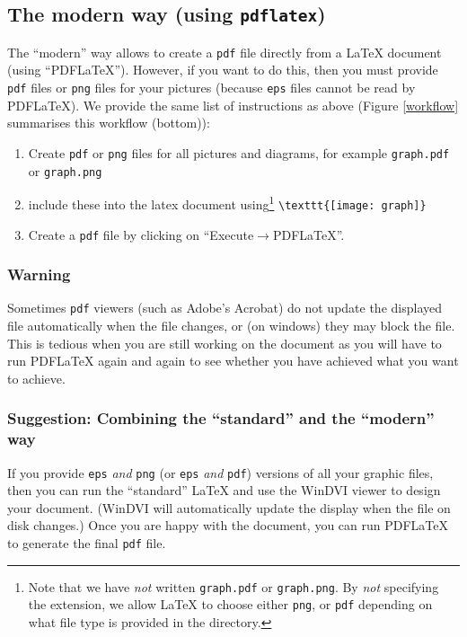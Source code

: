\documentclass[12pt,a4paper]{article}
\begin{document}
\subsection{The modern way  (using \texttt{pdflatex})}

The ``modern'' way allows to create a \texttt{pdf} file directly from
a LaTeX document (using ``PDFLaTeX''). However, if you want to do
this, then you must provide \texttt{pdf} files or \texttt{png} files
for your pictures (because \texttt{eps} files cannot be read by
PDFLaTeX). We provide the same list of instructions as above (Figure
\ref{workflow} summarises this workflow (bottom)):

\begin{enumerate}
\item Create \texttt{pdf} or \texttt{png} files for all pictures and
  diagrams, for example \texttt{graph.pdf} or \texttt{graph.png}
\item include these into the latex document using\footnote{Note that
    we have \emph{not} written \texttt{graph.pdf} or
    \texttt{graph.png}. By \emph{not} specifying the extension, we
    allow LaTeX to choose either \texttt{png}, or \texttt{pdf}
    depending on what file type is provided in the directory.}
  \verb|\texttt{[image: graph]}|
\item Create a \texttt{pdf} file by clicking on
  ``Execute$\rightarrow$PDFLaTeX''.
\end{enumerate}
\bigskip

\subsubsection*{Warning} 

Sometimes \texttt{pdf} viewers (such as Adobe's Acrobat) do not update
the displayed file automatically when the file changes, or (on
windows) they may block the file. This is tedious when you are still
working on the document as you will have to run PDFLaTeX again and
again to see whether you have achieved what you want to achieve.
\bigskip

\subsubsection*{Suggestion: Combining the ``standard'' and the
  ``modern'' way}

If you provide \texttt{eps} \emph{and} \texttt{png} (or \texttt{eps}
\emph{and} \texttt{pdf}) versions of all your graphic files, then you
can run the ``standard'' LaTeX and use the WinDVI viewer to design
your document. (WinDVI will automatically update the display when the
file on disk changes.) Once you are happy with the document, you can
run PDFLaTeX to generate the final \texttt{pdf} file.
\end{document}
